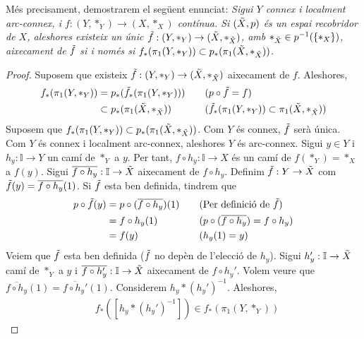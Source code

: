 \documentclass[compress,10pt]{article}
\theoremstyle{definition}
\begin{document}
Més precisament, demostrarem el següent enunciat: \textit{Sigui $Y$ connex i localment arc-connex, i $f:(Y,*_{Y})\rightarrow(X,*_{X})$ contínua. Si $(\Tilde{X},p)$ és un espai recobridor de $X$, aleshores existeix un únic $\Tilde{f}:(Y,*_{Y})\rightarrow(\Tilde{X},*_{\Tilde{X}})$, amb $*_{\Tilde{X}}\in p^{-1}(\{*_{X}\})$, aixecament de $\Tilde{f}$ si i només si $f_{*}(\pi_{1}(Y,*_{Y}))\subset p_{*}(\pi_{1}(\Tilde{X},*_{\Tilde{X}}))$.}
\begin{proof}
    Suposem que existeix $\Tilde{f}:(Y,*_{Y})\rightarrow(\Tilde{X},*_{\Tilde{X}})$ aixecament de $f$. Aleshores,
    \begin{align*}
        f_{*}(\pi_{1}(Y,*_{Y}))
        &=p_{*}(\Tilde{f}_{*}(\pi_{1}(Y,*_{Y})))
        &\quad&\textrm{($p\circ\Tilde{f}=f$)}\\
        &\subset p_{*}(\pi_{1}(\Tilde{X},*_{\Tilde{X}}))
        &\quad&\textrm{($\Tilde{f}_{*}(\pi_{1}(Y,*_{Y}))\subset\pi_{1}(\Tilde{X},*_{\Tilde{X}})$)}
    \end{align*}
    Suposem que $f_{*}(\pi_{1}(Y,*_{Y}))\subset p_{*}(\pi_{1}(\Tilde{X},*_{\Tilde{X}}))$. Com $Y$ és connex, $\Tilde{f}$ serà única. Com $Y$ és connex i localment arc-connex, aleshores $Y$ és arc-connex. Sigui $y\in Y$ i $h_{y}:\mathbb{I}\rightarrow Y$ un camí de $*_{Y}$ a $y$. Per tant, $f\circ h_{y}:\mathbb{I}\rightarrow X$ és un camí de $f(*_{Y})=*_{X}$ a $f(y)$. Sigui $\overline{f\circ h_{y}}:\mathbb{I}\rightarrow\Tilde{X}$ aixecament de $f\circ h_{y}$. Definim $\Tilde{f}:Y\rightarrow\Tilde{X}$ com $\Tilde{f}(y)=\overline{f\circ h_{y}}(1)$. Si $\Tilde{f}$ esta ben definida, tindrem que
    \begin{align*}
        p\circ\Tilde{f}(y)
        &=p\circ(\overline{f\circ h_{y}})(1)
        &\quad&\textrm{(Per definició de $\Tilde{f}$)}\\
        &=f\circ h_{y}(1)
        &\quad&\textrm{($p\circ(\overline{f\circ h_{y}})=f\circ h_{y}$)}\\
        &=f(y)
        &\quad&\textrm{($h_{y}(1)=y$)}
    \end{align*}
    Veiem que $\Tilde{f}$ esta ben definida ($\Tilde{f}$ no depèn de l'elecció de $h_{y}$). Sigui $h_{y}':\mathbb{I}\rightarrow\Tilde{X}$ camí de $*_{Y}$ a $y$ i $\overline{f\circ h_{y}'}:\mathbb{I}\rightarrow\Tilde{X}$ aixecament de $f\circ h_{y}'$. Volem veure que $\overline{f\circ h_{y}}(1)=\overline{f\circ h_{y}'}(1)$. Considerem $h_{y}*(h_{y}')^{-1}$. Aleshores,
    \begin{align*}
        &f_{*}([h_{y}*(h_{y}')^{-1}])\in f_{*}(\pi_{1}(Y,*_{Y}))

\end{align*}
\end{proof}
\end{document}
